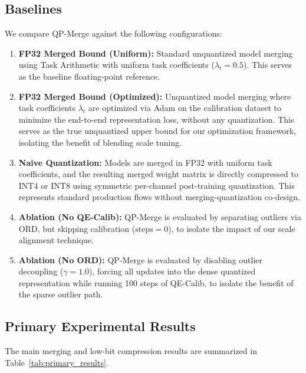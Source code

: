 \subsection{Baselines}
We compare QP-Merge against the following configurations:
\begin{enumerate}
    \item \textbf{FP32 Merged Bound (Uniform):} Standard unquantized model merging using Task Arithmetic \cite{ilharco2022editing} with uniform task coefficients ($\lambda_t = 0.5$). This serves as the baseline floating-point reference.
    \item \textbf{FP32 Merged Bound (Optimized):} Unquantized model merging where task coefficients $\lambda_t$ are optimized via Adam on the calibration dataset to minimize the end-to-end representation loss, without any quantization. This serves as the true unquantized upper bound for our optimization framework, isolating the benefit of blending scale tuning.
    \item \textbf{Naive Quantization:} Models are merged in FP32 with uniform task coefficients, and the resulting merged weight matrix is directly compressed to INT4 or INT8 using symmetric per-channel post-training quantization. This represents standard production flows without merging-quantization co-design.
    \item \textbf{Ablation (No QE-Calib):} QP-Merge is evaluated by separating outliers via ORD, but skipping calibration ($\text{steps} = 0$), to isolate the impact of our scale alignment technique.
    \item \textbf{Ablation (No ORD):} QP-Merge is evaluated by disabling outlier decoupling ($\gamma = 1.0$), forcing all updates into the dense quantized representation while running 100 steps of QE-Calib, to isolate the benefit of the sparse outlier path.
\end{enumerate}

\subsection{Primary Experimental Results}
The main merging and low-bit compression results are summarized in Table~\ref{tab:primary_results}.

